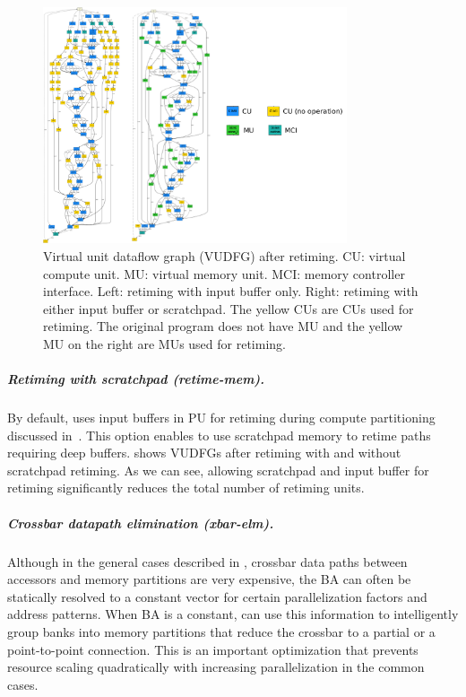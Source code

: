 \begin{figure}
\centering
\includegraphics[width=0.8\textwidth]{figs/retiming.pdf}
\caption[Retiming]{
  Virtual unit dataflow graph (VUDFG) after retiming. CU: virtual compute unit. MU: virtual memory unit. MCI: memory controller interface.
  Left: retiming with input buffer only. Right: retiming with either input buffer or scratchpad.
  The yellow CUs are CUs used for retiming. The original program does not have MU and the yellow MU
  on the right are MUs used for retiming. 
}
\label{fig:retiming}
\end{figure}
\subparagraph{Retiming with scratchpad (retime-mem).} 
By default, \name{} uses input buffers in PU for retiming during compute partitioning discussed
in~.
This option enables \name{} to use scratchpad memory to retime paths requiring deep buffers.
 shows VUDFGs after retiming with and without scratchpad retiming. As we can see,
allowing scratchpad and input buffer for retiming significantly reduces the total number of retiming
units.

\subparagraph{Crossbar datapath elimination (xbar-elm).}
Although in the general cases described in , 
crossbar data paths between accessors and memory partitions are very expensive, 
the BA can often be statically resolved to a constant vector for certain
parallelization factors and address patterns.  
When BA is a constant, \name{} can use this information to intelligently 
group banks into memory partitions that reduce the crossbar to a partial 
or a point-to-point connection.
This is an important optimization that prevents resource scaling quadratically with increasing
parallelization in the common cases.

